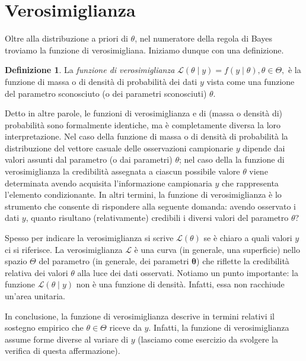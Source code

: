 \documentclass[
  10pt,
  italian,
  a4paper,
  extrafontsizes,onecolumn,openright
  ]{memoir}
\newlength{\rf}
\theoremstyle{definition}
\newtheorem{definition}{Definizione}[chapter]
\theoremstyle{definition}
\theoremstyle{definition}
\theoremstyle{definition}
\theoremstyle{remark}
\begin{document}
\hypertarget{verosimiglianza}{%
\section{Verosimiglianza}\label{verosimiglianza}}

Oltre alla distribuzione a priori di \(\theta\), nel numeratore della regola di Bayes troviamo la funzione di verosimigliana. Iniziamo dunque con una definizione.

\begin{definition}
La \emph{funzione di verosimiglianza} \(\mathcal{L}(\theta \mid y) = f(y \mid \theta), \theta \in \Theta,\) è la funzione di massa o di densità di probabilità dei dati \(y\) vista come una funzione del parametro sconosciuto (o dei parametri sconosciuti) \(\theta\).
\end{definition}

Detto in altre parole, le funzioni di verosimiglianza e di (massa o densità di) probabilità sono formalmente identiche, ma è completamente diversa la loro interpretazione. Nel caso della funzione di massa o di densità di probabilità la distribuzione del vettore casuale delle osservazioni campionarie \(y\) dipende dai valori assunti dal parametro (o dai parametri) \(\theta\); nel caso della la funzione di verosimiglianza la credibilità assegnata a ciascun possibile valore \(\theta\) viene determinata avendo acquisita l'informazione campionaria \(y\) che rappresenta l'elemento condizionante. In altri termini, la funzione di verosimiglianza è lo strumento che consente di rispondere alla seguente domanda: avendo osservato i dati \(y\), quanto risultano (relativamente) credibili i diversi valori del parametro \(\theta\)?

Spesso per indicare la verosimiglianza si scrive \(\mathcal{L}(\theta)\) se è chiaro a quali valori \(y\) ci si riferisce. La verosimiglianza \(\mathcal{L}\) è una curva (in generale, una superficie) nello spazio \(\Theta\) del parametro (in generale, dei parametri \(\boldsymbol\theta\)) che riflette la credibilità relativa dei valori \(\theta\) alla luce dei dati osservati. Notiamo un punto importante: la funzione \(\mathcal{L}(\theta \mid y)\) non è una funzione di densità. Infatti, essa non racchiude un'area unitaria.

In conclusione, la funzione di verosimiglianza descrive in termini relativi il sostegno empirico che \(\theta \in \Theta\) riceve da \(y\). Infatti, la funzione di verosimiglianza assume forme diverse al variare di \(y\) (lasciamo come esercizio da svolgere la verifica di questa affermazione).
\end{document}

